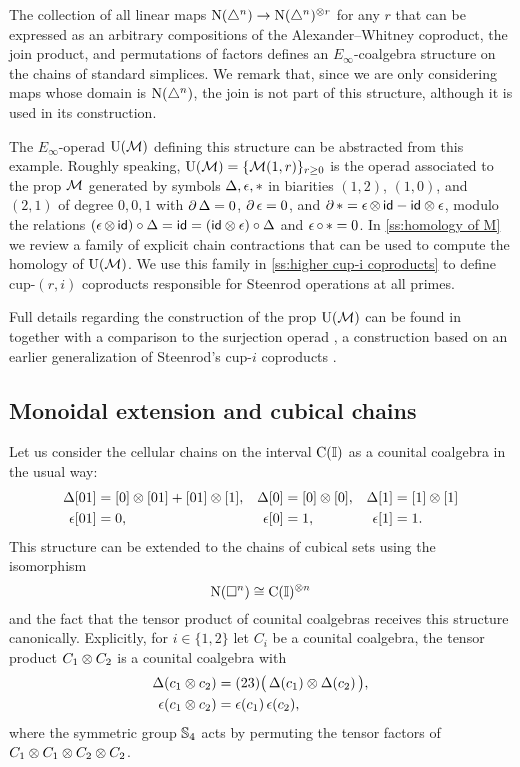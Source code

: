 The collection of all linear maps $\operatorname{N}(\triangle^n) \to \operatorname{N}(\triangle^n)^{\otimes r}$ for any $r$ that can be expressed as an arbitrary compositions of the Alexander--Whitney coproduct, the join product, and permutations of factors defines an $E_\infty$-coalgebra structure on the chains of standard simplices.
We remark that, since we are only considering maps whose domain is $\operatorname{N}(\triangle^n)$, the join is not part of this structure, although it is used in its construction.

The $E_\infty$-operad $\operatorname{\mathrm{U}(\mathcal{M})}$ defining this structure can be abstracted from this example.
Roughly speaking, $\operatorname{\mathrm{U}(\mathcal{M})} = \{\operatorname{\mathcal{M}}(1,r)\}_{r \geq 0}$ is the operad associated to the prop $\operatorname{\mathcal{M}}$ generated by symbols $\operatorname{\Delta}, \operatorname{\epsilon}, \operatorname{\ast}$ in biarities $(1,2)$, $(1,0)$, and $(2,1)$ of degree $0,0,1$ with $\operatorname{\partial} \operatorname{\Delta} = 0$, $\operatorname{\partial} \operatorname{\epsilon} = 0$, and $\operatorname{\partial} \operatorname{\ast} = \operatorname{\epsilon} \otimes \, \mathsf{id} - \mathsf{id} \otimes \operatorname{\epsilon}$, modulo the relations $(\operatorname{\epsilon} \otimes \, \mathsf{id}) \circ \operatorname{\Delta} = \mathsf{id} = (\mathsf{id} \otimes \operatorname{\epsilon}) \circ \operatorname{\Delta}$ and $\operatorname{\epsilon} \circ \, \ast = 0$.
In \cref{ss:homology of M} we review a family of explicit chain contractions that can be used to compute the homology of $\operatorname{\mathrm{U}(\mathcal{M})}$.
We use this family in \cref{ss:higher cup-i coproducts} to define cup-$(r,i)$ coproducts responsible for Steenrod operations at all primes.

Full details regarding the construction of the prop $\operatorname{\mathrm{U}(\mathcal{M})}$ can be found in \cite{medina2020prop1, medina2021prop2} together with a comparison to the surjection operad \cite{mcclure2003multivariable, berger2004combinatorial}, a construction based on an earlier generalization of Steenrod's cup-$i$ coproducts \cite[\S4.5]{benson1998representations}.

\subsection{Monoidal extension and cubical chains}

Let us consider the cellular chains on the interval $\operatorname{C}(\mathbb{I})$ as a counital coalgebra in the usual way:
\begin{align*}
\operatorname{\Delta}[01] &= [0] \otimes [01] + [01] \otimes [1], &
\operatorname{\Delta}[0]  &= [0] \otimes [0], &
\operatorname{\Delta}[1]  &= [1] \otimes [1] \\
\operatorname{\epsilon}[01] &= 0, &
\operatorname{\epsilon}[0]  &= 1, &
\operatorname{\epsilon} [1]  &= 1.
\end{align*}
This structure can be extended to the chains of cubical sets using the isomorphism
\[
\operatorname{N}(\square^n) \cong \operatorname{C}(\mathbb{I})^{\otimes n}
\]
and the fact that the tensor product of counital coalgebras receives this structure canonically.
Explicitly, for $i \in \{1,2\}$ let $C_i$ be a counital coalgebra, the tensor product $C_1 \otimes C_2$ is a counital coalgebra with
\begin{align} \label{e:extension of coproduct}
\operatorname{\Delta}(c_1 \otimes c_2) &= (23) \big( \operatorname{\Delta}(c_1) \otimes \operatorname{\Delta}(c_2) \, \big), \\
\label{e:extension of augmentation}
\operatorname{\epsilon}(c_1 \otimes c_2) &= \operatorname{\epsilon}(c_1) \operatorname{\epsilon}(c_2),
\end{align}
where the symmetric group $\mathbb{S}_4$ acts by permuting the tensor factors of $C_1 \otimes C_1 \otimes C_2 \otimes C_2$.

